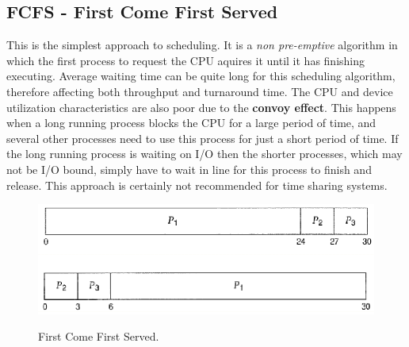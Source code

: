 \documentclass[10pt,a4paper]{article}
\begin{document}
\begin{itemize}
\subsection{FCFS - First Come First Served}
This is the simplest approach to scheduling. It is a {\it non pre-emptive} algorithm in which the first process to request the CPU aquires it until it has finishing executing. Average waiting time can be quite long for this scheduling algorithm, therefore affecting both throughput and turnaround time. The CPU and device utilization characteristics are also poor due to the {\bf convoy effect}. This happens when a long running process blocks the CPU for a large period of time, and several other processes need to use this process for just a short period of time. If the long running process is waiting on I/O then the shorter processes, which may not be I/O bound, simply have to wait in line for this process to finish and release. This approach is certainly not recommended for time sharing systems.  
\begin{figure}
\caption{First Come First Served. \cite{OSCONCEPTS}}
\begin{center}
\includegraphics[scale=0.45]{../images/fcfs-sched.png}
\label{fcfs}
\end{center}
\end{figure}

\end{itemize}
\end{document}
